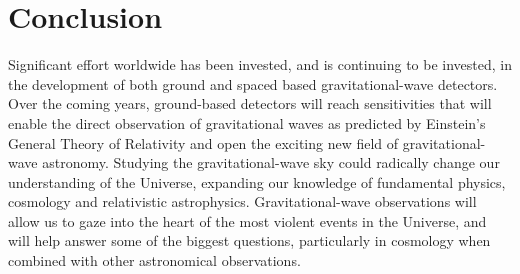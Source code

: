 \section{Conclusion}
\label{section:conclusion} 

Significant effort worldwide has been invested, and is continuing to be
invested, in the development of both ground and spaced based gravitational-wave
detectors. Over the coming years, ground-based detectors will reach
sensitivities that will enable the direct observation of gravitational waves as
predicted by Einstein's General Theory of Relativity and open the exciting new
field of gravitational-wave astronomy. Studying the gravitational-wave
sky could radically change our understanding of the Universe, expanding our
knowledge of fundamental physics, cosmology and relativistic astrophysics.
Gravitational-wave observations will allow us to gaze into the heart of the most
violent events in the Universe, and will help answer some of the biggest
questions, particularly in cosmology when combined with other astronomical
observations.

